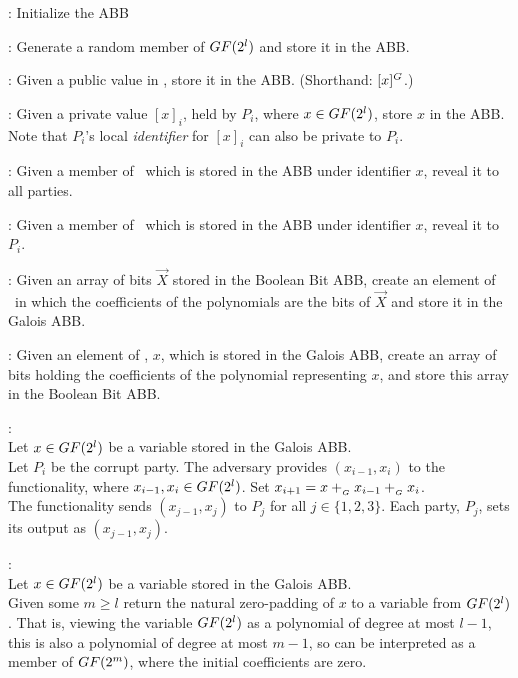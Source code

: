 \begin{functionality}
	\GalSetup{}: Initialize the ABB

	: Generate a random member of $GF(2^l)$
		and store it in the ABB.

	: Given a public value in \GFtwol, store it in the ABB.
		(Shorthand: $[x]^{G}$.)

	: Given a private value $[x]_i$, held by $P_i$, 
		where $x \in GF(2^l)$, store $x$ in the ABB.
		Note that $P_i$'s local \emph{identifier} for $[x]_i$ can also
		be private to $P_i$.

	: Given a member of \GFtwol~which is stored in the ABB 
		under identifier $x$, reveal it to all parties.

	: Given a member of \GFtwol~which is stored in the ABB
		under identifier $x$, reveal it to $P_i$.

	: Given an array of bits $\vec{X}$ stored in the 
		Boolean Bit ABB, create an element of \GFtwol~in which the
		coefficients of the polynomials are the bits of $\vec{X}$
		and store it in the Galois ABB.

	: Given an element of \GFtwol, $x$,
		which is stored in the Galois ABB, 
		create an array of bits holding the coefficients of the 
		polynomial representing $x$,
		and store this array in the Boolean Bit ABB.

	: \\
		Let $x \in GF(2^l)$ be a variable stored in the Galois ABB. \\
		Let $P_i$ be the corrupt party.
		The adversary provides $(x_{i-1}, x_i)$ to the functionality,
		where $x_{i-1}, x_i \in GF(2^l)$. 
		Set $x_{i+1} = x +_{_G} x_{i-1} +_{_G} x_i$. \\
		The functionality sends $(x_{j-1}, x_j)$ 
		to $P_j$ for all $j \in \{1, 2, 3\}$.
		Each party, $P_j$, sets its output as $(x_{j-1}, x_j)$.

	:\\
		Let $x \in GF(2^l)$ be a variable stored in the Galois ABB. \\
		Given some $m \geq l$ return the natural zero-padding of 
		$x$ to a variable from $GF(2^l)$.
		That is, viewing the variable $GF(2^l)$ as a polynomial of 
		degree at most $l-1$,
		this is also a polynomial of degree at most $m-1$,
		so can be interpreted as a member of $GF(2^m)$,
		where the initial coefficients are zero.


\end{functionality}
